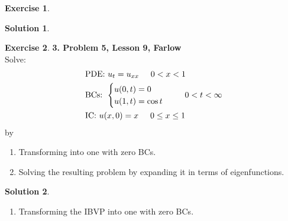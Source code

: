 \documentclass{article}
\theoremstyle{definition}
\newtheorem*{exer*}{Exercise}
\newtheorem*{sln*}{Solution}
\begin{document}
\begin{exer*}
\begin{sln*}
	\end{sln*}
	
	
\end{exer*}

\newpage

\begin{exer*}\textbf{3. Problem 5, Lesson 9, Farlow}\\
	
	
	Solve:
	\begin{align*}
	&\text{PDE: } u_t = u_{xx}\hspace{0.5cm} 0 < x < 1\\
	&\text{BCs: } \begin{cases}
	u(0,t) = 0\\
	u(1,t) = \cos t
	\end{cases}\hspace{0.5cm} 0 < t < \infty\\
	&\text{IC: } u(x,0) = x\hspace{0.5cm}0\leq x\leq 1
	\end{align*}
	by
	
	\begin{enumerate}
		\item Transforming into one with zero BCs.\\
		\item Solving the resulting problem by expanding it in terms of eigenfunctions.\\
	\end{enumerate}
	
	
	
	
	\begin{sln*}
		$\,$
		\begin{enumerate}
			\item Transforming the IBVP into one with zero BCs.\\
			

\end{enumerate}
\end{sln*}
\end{exer*}
\end{document}
